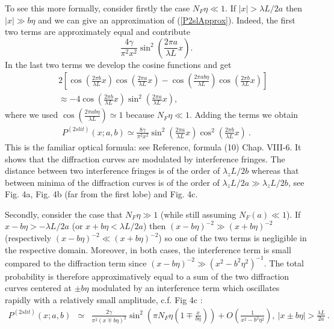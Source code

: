 \documentclass[12pt,aps,prb,preprint]{revtex4-1}   %
\begin{document}
To see this more formally, consider firstly the case
$N_F\eta\ll1$. If $|x|>\lambda L/2a$ then $|x|\gg b\eta$ and we
can give an approximation of (\ref{P2slApprox}). Indeed, the first
two terms are approximately equal and contribute $$
\frac{4\gamma}{\pi^2 x^2} \sin^2 ( \frac{2 \pi a}{\lambda L} x).
$$  In the last two terms we develop the cosine functions and get
\begin{eqnarray*}
&& 2 \left[\cos{(\frac{2\pi b}{\lambda L}x)}\cos{(\frac{2\pi
a}{\lambda L}x)}-\cos{(\frac{2\pi ab\eta}{\lambda
L})}\cos{(\frac{2\pi b}{\lambda L}x)} \right] \\ && \approx -4
\cos (\frac{2 \pi b}{\lambda L} x) \sin^2 (\frac{2 \pi a}{\lambda
L} x),
\end{eqnarray*}
where we used $\cos{(\frac{2\pi ab\eta}{\lambda L})}\simeq1$
because $N_F\eta\ll1$. Adding the terms we obtain
\begin{eqnarray}\label{P2slApprox2}
P^{(2slit)}(x;a,b) \simeq \frac{8\gamma}{\pi^2
x^2}\sin^2{(\frac{2\pi a}{\lambda L}x)} \cos^2{(\frac{2\pi
b}{\lambda L}x)}\ .
\end{eqnarray}
This is the familiar optical formula: see Reference,\cite{Optics} formula
(10) Chap. VIII-6. It shows that the diffraction curves are modulated by
interference fringes. The distance between two interference
fringes is of the order of $\lambda_z L/2b$ whereas that between
minima of the diffraction curves is of the order of $\lambda_z
L/2a \gg \lambda_z L/2b$, see Fig. 4a, Fig. 4b (far from the first
lobe) and Fig. 4c.

Secondly, consider the case that $N_F\eta\gg1$ (while still
assuming $N_F(a)\ll 1$). If $x-b\eta>-\lambda L/2a$ (or
$x+b\eta<\lambda L/2a$) then $(x-b\eta)^{-2}\gg (x+b\eta)^{-2}$
(respectively $(x-b\eta)^{-2}\ll (x+b\eta)^{-2}$) so one of the
two terms is negligible in the respective domain. Moreover, in
both cases, the interference term is small compared to the
diffraction term since $(x-b\eta)^{-2}\gg (x^2-b^2\eta^2)^{-1}$.
The total probability is therefore approximatively equal to a sum
of the two diffraction curves centered at $\pm b\eta$ modulated by
an interference term which oscillates rapidly with a relatively
small amplitude, c.f. Fig 4c :
\begin{eqnarray} \label{P2slApprox3}
P^{(2 slit)}(x;a,b) &\simeq & \frac{2\gamma}{\pi^2 (x\mp b\eta)^2}
\sin^2 \left(\pi N_F \eta (1\mp\frac{x}{b\eta}) \right) +
O(\frac{1}{x^2-b^2\eta^2}),\ |x\pm b\eta| > \frac{\lambda L}{2a}\
.
\end{eqnarray}
\end{document}
